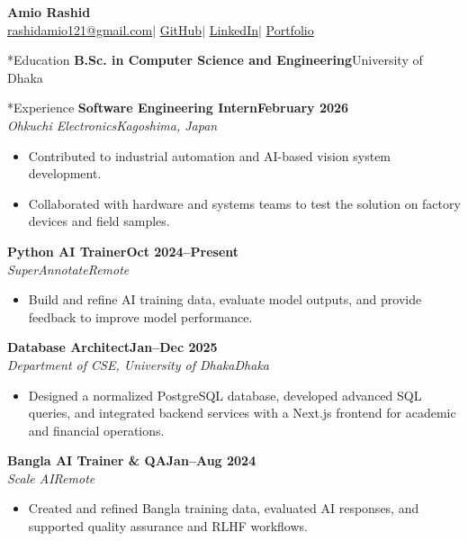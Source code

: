 \documentclass[10pt,a4paper]{article}
\makeatletter
\renewcommand\section{\@startsection{section}{1}{0pt}{8pt}{3pt}{\large\bfseries\color{deepblue}}}
\newcommand{\role}[4]{%
  \textbf{#1}\hfill\textbf{#3}\\
  \textit{#2}\hfill\textit{#4}\vspace{-2pt}}
\makeatother
\begin{document}
\begin{center}
  {\LARGE\bfseries Amio Rashid}\\[3pt]
  \href{mailto:rashidamio121@gmail.com}{rashidamio121@gmail.com}\quad $\vert$ \quad
  \href{https://github.com/Flamy-A}{GitHub}\quad $\vert$ \quad
  \href{https://www.linkedin.com/in/amio-rashid-0808b52b8/}{LinkedIn}\quad $\vert$ \quad
  \href{https://amio-portfolio.vercel.app/}{Portfolio}
\end{center}

\section*{Education}
\textbf{B.Sc. in Computer Science and Engineering}\hfill University of Dhaka

\section*{Experience}
\role{Software Engineering Intern}{Ohkuchi Electronics}{February 2026}{Kagoshima, Japan}
\begin{itemize}
  \item Contributed to industrial automation and AI-based vision system development.
  \item Collaborated with hardware and systems teams to test the solution on factory devices and field samples.
\end{itemize}

\role{Python AI Trainer}{SuperAnnotate}{Oct 2024--Present}{Remote}
\begin{itemize}
  \item Build and refine AI training data, evaluate model outputs, and provide feedback to improve model performance.
\end{itemize}

\role{Database Architect}{Department of CSE, University of Dhaka}{Jan--Dec 2025}{Dhaka}
\begin{itemize}
  \item Designed a normalized PostgreSQL database, developed advanced SQL queries, and integrated backend services with a Next.js frontend for academic and financial operations.
\end{itemize}

\role{Bangla AI Trainer \& QA}{Scale AI}{Jan--Aug 2024}{Remote}
\begin{itemize}
  \item Created and refined Bangla training data, evaluated AI responses, and supported quality assurance and RLHF workflows.
\end{itemize}
\end{document}
